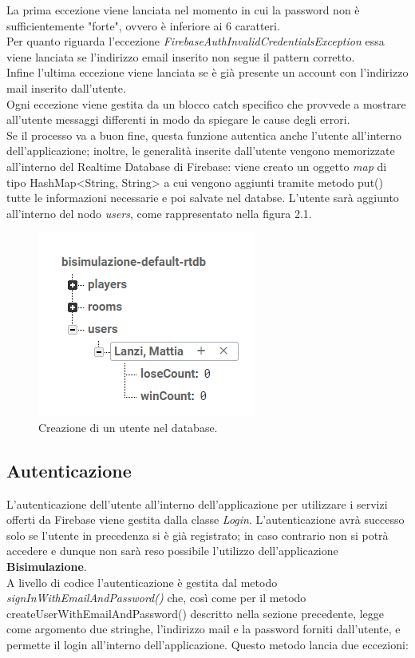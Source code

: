 \documentclass[a4paper,12pt,twoside,openright]{report}
\begin{document}
La prima eccezione viene lanciata nel momento in cui la password non è sufficientemente "forte", ovvero è inferiore ai 6 caratteri.\\
Per quanto riguarda l'eccezione \textit{FirebaseAuthInvalidCredentialsException} essa viene lanciata se l'indirizzo email inserito non segue il pattern corretto.\\
Infine l'ultima eccezione viene lanciata se è già presente un account con l'indirizzo mail inserito dall'utente.\\
Ogni eccezione viene gestita da un blocco catch specifico che provvede a mostrare all'utente messaggi differenti in modo da spiegare le cause degli errori.\\
 Se il processo va a buon fine, questa funzione autentica anche l'utente all'interno dell'applicazione; inoltre, le generalità inserite dall'utente vengono memorizzate all'interno del Realtime Database di Firebase: viene creato un oggetto \textit{map} di tipo HashMap<String, String> a cui vengono aggiunti tramite metodo put() tutte le informazioni necessarie e poi salvate nel databse. L'utente sarà aggiunto all'interno del nodo \textit{users}, come rappresentato nella figura 2.1.
\begin{figure}[h]
\includegraphics{images/Users node.png}
\caption{Creazione di un utente nel database.}
\end{figure}

\subsection{Autenticazione}
L'autenticazione dell'utente all'interno dell'applicazione per utilizzare i servizi offerti da Firebase viene gestita dalla classe \textit{Login}. L'autenticazione avrà successo solo se l'utente in precedenza si è già registrato; in caso contrario non si potrà accedere e dunque non sarà reso possibile l'utilizzo dell'applicazione \textbf{Bisimulazione}.\\
A livello di codice l'autenticazione è gestita dal metodo \textit{signInWithEmailAndPassword()} che, così come per il metodo createUserWithEmailAndPassword() descritto nella sezione precedente, legge come argomento due stringhe, l'indirizzo mail e la password forniti dall'utente, e permette il login all'interno dell'applicazione. Questo metodo lancia due eccezioni:
\end{document}

